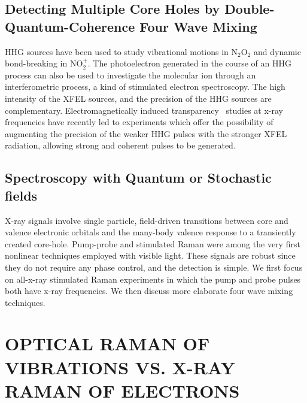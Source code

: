 \documentclass{ar-1col}
\begin{document}
\subsection{Detecting Multiple Core Holes by Double-Quantum-Coherence Four Wave Mixing}
HHG sources have been used to study vibrational motions in
$\textrm{N}_2\textrm{O}_2$\cite{li_time-resolved_2008,li_visualizing_2010}
and dynamic bond-breaking in
$\textrm{NO}_2^+$.\cite{zhou_probing_2012} The photoelectron generated in the course of an
HHG process can also be used to investigate the molecular ion through
an interferometric process, a kind of stimulated electron
spectroscopy.\cite{zhou_molecular_2008} The high intensity of the XFEL
sources, and the precision of the HHG sources are
complementary. Electromagnetically induced transparency~\cite{buth_electromagnetically_2007}
studies at x-ray frequencies have
recently led to experiments\cite{rohlsberger_electromagnetically_2012}
which offer the possibility of augmenting the precision of the weaker
HHG pulses with the stronger XFEL radiation, allowing strong and
coherent pulses to be generated.


\subsection{Spectroscopy with Quantum or Stochastic fields}
X-ray signals involve single particle, field-driven transitions
between core and valence electronic orbitals and the many-body valence
response to a transiently created
core-hole.\cite{gadzuk_core_1987,rohringer_x-ray_2007,glownia_time-resolved_2010}
Pump-probe and stimulated Raman were among the very first nonlinear
techniques employed with visible
light.\cite{p.m._direct_1968,eckhardt_stimulated_1962,penzkofer_high_1979}
These signals are robust since they do not require any phase control,
and the detection is simple.  We first focus on all-x-ray stimulated
Raman experiments in which the pump and probe pulses both have x-ray
frequencies.  We then discuss more elaborate four wave mixing
techniques.


\begin{marginnote}
\end{marginnote}

\section{OPTICAL RAMAN OF VIBRATIONS VS. X-RAY RAMAN OF ELECTRONS}
\end{document}
